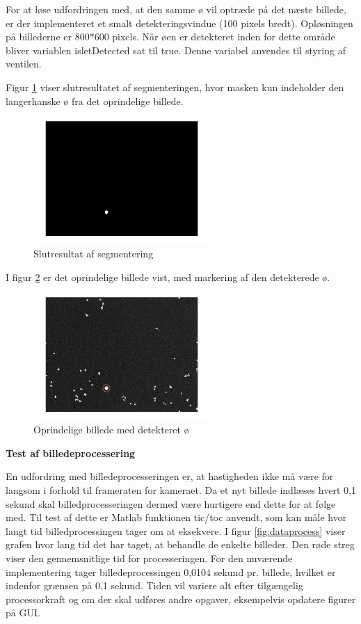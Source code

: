 For at løse udfordringen med, at den samme ø vil optræde på det næste billede, er der implementeret et smalt detekteringsvindue (100 pixels bredt). Opløsningen på billederne er 800*600 pixels. Når øen er detekteret inden for dette område bliver variablen isletDetected sat til true. Denne variabel anvendes til styring af ventilen. 
 
Figur \ref{fig:segmented} viser slutresultatet af segmenteringen, hvor masken kun indeholder den langerhanske ø fra det oprindelige billede. 


\begin{figure}[H]
	\centering
	\includegraphics[width=0.6\textwidth]{billeder/software/segmented.png}
	\caption{Slutresultat af segmentering}
	\label{fig:segmented}
\end{figure}

I figur \ref{fig:finalimage} er det oprindelige billede vist, med markering af den detekterede ø.


\begin{figure}[H]
	\centering
	\includegraphics[width=0.6\textwidth]{billeder/software/finalimage.png}
	\caption{Oprindelige billede med detekteret ø}
	\label{fig:finalimage}
\end{figure}

\newpage
\textbf{Test af billedeprocessering}

En udfordring med billedeprocesseringen er, at hastigheden ikke må være for langsom i forhold til frameraten for kameraet. Da et nyt billede indlæses hvert 0,1 sekund skal billedprocesseringen dermed være hurtigere end dette for at følge med. Til test af dette er Matlab funktionen tic/toc anvendt, som kan måle hvor langt tid billedprocessingen tager om at eksekvere. I figur \ref{fig:dataprocess} viser grafen hvor lang tid det har taget, at behandle de enkelte billeder. Den røde streg viser den gennemsnitlige tid for processeringen. For den nuværende implementering tager billedeprocessingen 0,0104 sekund pr. billede, hvilket er indenfor grænsen på 0,1 sekund. Tiden vil variere alt efter tilgængelig processorkraft og om der skal udføres andre opgaver, eksempelvis opdatere figurer på GUI. 

